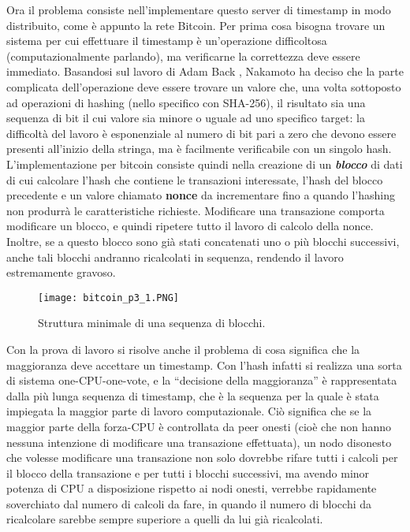 Ora il problema consiste nell'implementare questo server di timestamp in modo distribuito, come è appunto la rete Bitcoin. Per prima cosa bisogna trovare un sistema per cui effettuare il timestamp è un'operazione difficoltosa (computazionalmente parlando), ma verificarne la correttezza deve essere immediato. Basandosi sul lavoro di Adam Back \cite{hashcash}, Nakamoto ha deciso che la parte complicata dell'operazione deve essere trovare un valore che, una volta sottoposto ad operazioni di hashing (nello specifico con SHA-256), il risultato sia una sequenza di bit il cui valore sia minore o uguale ad uno specifico target: la difficoltà del lavoro è esponenziale al numero di bit pari a zero che devono essere presenti all'inizio della stringa, ma è facilmente verificabile con un singolo hash. L'implementazione per bitcoin consiste quindi nella creazione di un \emph{\textbf{blocco}} di dati di cui calcolare l'hash che contiene le transazioni interessate, l'hash del blocco precedente e un valore chiamato \textbf{nonce} da incrementare fino a quando l'hashing non produrrà le caratteristiche richieste. Modificare una transazione comporta modificare un blocco, e quindi ripetere tutto il lavoro di calcolo della nonce. Inoltre, se a questo blocco sono già stati concatenati uno o più blocchi successivi, anche tali blocchi andranno ricalcolati in sequenza, rendendo il lavoro estremamente gravoso.

\begin{figure}[htbp]
\centering
\texttt{[image: bitcoin\_p3\_1.PNG]}
\caption[Blockchain minimale]{Struttura minimale di una sequenza di blocchi.\label{bitcoin_p3_1}}
\end{figure}

Con la prova di lavoro si risolve anche il problema di cosa significa che la maggioranza deve accettare un timestamp. Con l'hash infatti si realizza una sorta di sistema one-CPU-one-vote, e la ``decisione della maggioranza'' è rappresentata dalla più lunga sequenza di timestamp, che è la sequenza per la quale è stata impiegata la maggior parte di lavoro computazionale. Ciò significa che se la maggior parte della forza-CPU è controllata da peer onesti (cioè che non hanno nessuna intenzione di modificare una transazione effettuata), un nodo disonesto che volesse modificare una transazione non solo dovrebbe rifare tutti i calcoli per il blocco della transazione e per tutti i blocchi successivi, ma avendo minor potenza di CPU a disposizione rispetto ai nodi onesti, verrebbe rapidamente soverchiato dal numero di calcoli da fare, in quando il numero di blocchi da ricalcolare sarebbe sempre superiore a quelli da lui già ricalcolati.\\

